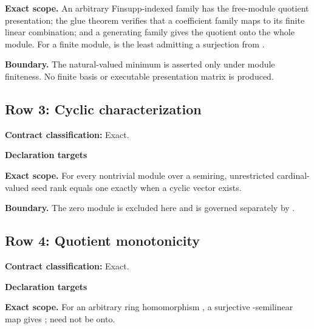 {\small\noindent{}\par}
{\small\noindent{}\par}
{\small\noindent{}\par}
\medskip\noindent\textbf{Exact scope.} An arbitrary Finsupp-indexed family has the free-module quotient presentation; the glue theorem verifies that a coefficient family maps to its finite linear combination; and a generating family gives the quotient onto the whole module. For a finite module,  is the least  admitting a surjection from .
\par\smallskip\noindent\textbf{Boundary.} The natural-valued minimum is asserted only under module finiteness. No finite basis or executable presentation matrix is produced.
\medskip
{}\subsection{Row 3: Cyclic characterization}
\label{row:3}
\textbf{Contract classification:} Exact.
\par\smallskip\textbf{Declaration targets}\par
{\small\noindent{}\par}
\medskip\noindent\textbf{Exact scope.} For every nontrivial module over a semiring, unrestricted cardinal-valued seed rank equals one exactly when a cyclic vector exists.
\par\smallskip\noindent\textbf{Boundary.} The zero module is excluded here and is governed separately by .
\medskip
{}\subsection{Row 4: Quotient monotonicity}
\label{row:4}
\textbf{Contract classification:} Exact.
\par\smallskip\textbf{Declaration targets}\par
{\small\noindent{}\par}
\medskip\noindent\textbf{Exact scope.} For an arbitrary ring homomorphism , a surjective -semilinear map gives ;  need not be onto.
